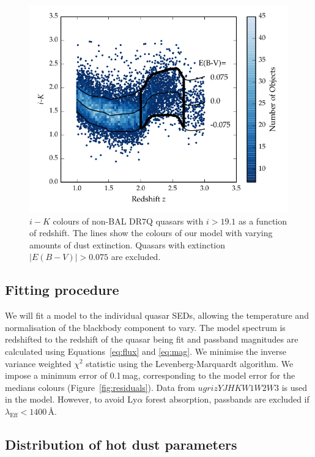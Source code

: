 \begin{figure}[t!]
  \centering
  \includegraphics[width=\columnwidth]{figures/chapter05/ik_versus_z_low_ext.pdf}
  \caption[{$i-K$ colours of non-BAL DR$7$ quasars with $i>19.1$ as a function of redshift.}]{$i-K$ colours of non-BAL DR$7$Q quasars with $i>19.1$ as a function of redshift. The lines show the colours of our model with varying amounts of dust extinction. Quasars with extinction $|E(B-V)|>0.075$ are excluded.}
  \label{fig:ikzplot}
\end{figure}


\subsection{Fitting procedure}

We will fit a model to the individual quasar SEDs, allowing the temperature and normalisation of the blackbody component to vary. 
The model spectrum is redshifted to the redshift of the quasar being fit and passband magnitudes are calculated using Equations~\ref{eq:flux} and \ref{eq:mag}.   
We minimise the inverse variance weighted $\chi^2$ statistic using the Levenberg-Marquardt algorithm. 
We impose a minimum error of 0.1\,mag, corresponding to the model error for the medians colours (Figure~\ref{fig:residuals}). 
Data from $ugrizYJHKW1W2W3$ is used in the model. 
However, to avoid Ly$\alpha$ forest absorption, passbands are excluded if $\lambda_{\text{Eff}} < 1400$\,\AA.   

\subsection{Distribution of hot dust parameters}


